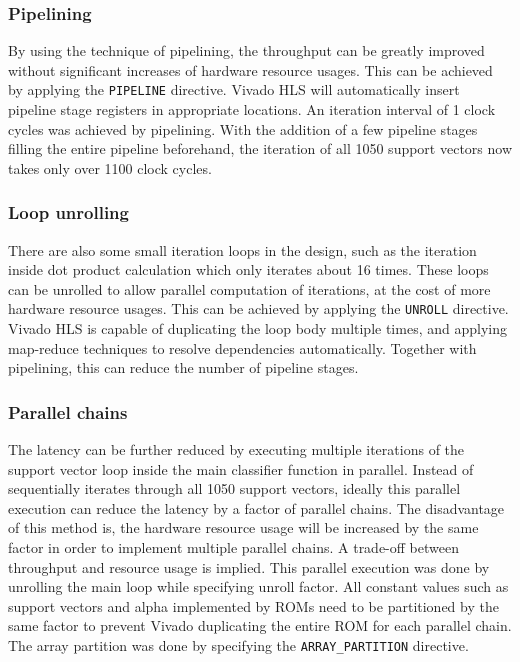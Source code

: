 \documentclass[journal]{IEEEtran}
\begin{document}
\subsubsection{Pipelining}

By using the technique of pipelining, the throughput can be greatly improved without significant increases of hardware resource usages. This can be achieved by applying the \texttt{PIPELINE} directive. Vivado HLS will automatically insert pipeline stage registers in appropriate locations. An iteration interval of 1 clock cycles was achieved by pipelining. With the addition of a few pipeline stages filling the entire pipeline beforehand, the iteration of all 1050 support vectors now takes only over 1100 clock cycles.

\subsubsection{Loop unrolling}

There are also some small iteration loops in the design, such as the iteration inside dot product calculation which only iterates about 16 times. These loops can be unrolled to allow parallel computation of iterations, at the cost of more hardware resource usages. This can be achieved by applying the \texttt{UNROLL} directive. Vivado HLS is capable of duplicating the loop body multiple times, and applying map-reduce techniques to resolve dependencies automatically. Together with pipelining, this can reduce the number of pipeline stages.

\subsubsection{Parallel chains}

The latency can be further reduced by executing multiple iterations of the support vector loop inside the main classifier function in parallel. Instead of sequentially iterates through all 1050 support vectors, ideally this parallel execution can reduce the latency by a factor of parallel chains.
The disadvantage of this method is, the hardware resource usage will be increased by the same factor in order to implement multiple parallel chains. A trade-off between throughput and resource usage is implied.
This parallel execution was done by unrolling the main loop while specifying unroll factor. All constant values such as support vectors and alpha implemented by ROMs need to be partitioned by the same factor to prevent Vivado duplicating the entire ROM for each parallel chain. The array partition was done by specifying the \texttt{ARRAY\_PARTITION} directive.
\end{document}
